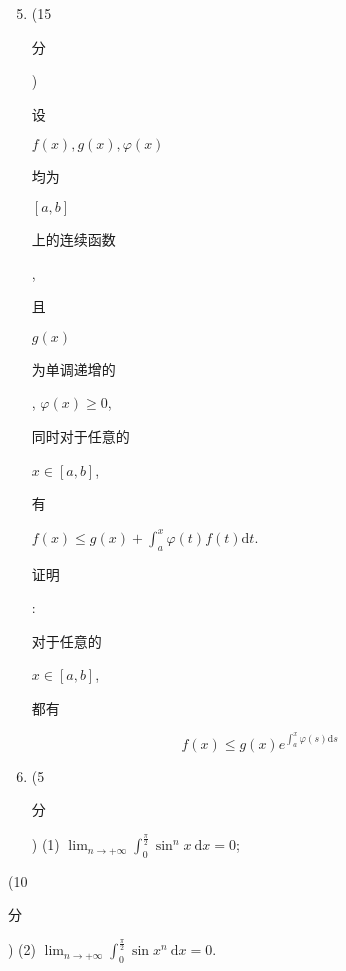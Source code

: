 \documentclass[10pt]{article}
\begin{document}
\begin{enumerate}
  \setcounter{enumi}{4}
  \item (15 \begin{CJK}{UTF8}{mj}分\end{CJK}) \begin{CJK}{UTF8}{mj}设\end{CJK} $f(x), g(x), \varphi(x)$ \begin{CJK}{UTF8}{mj}均为\end{CJK} $[a, b]$ \begin{CJK}{UTF8}{mj}上的连续函数\end{CJK}, \begin{CJK}{UTF8}{mj}且\end{CJK} $g(x)$ \begin{CJK}{UTF8}{mj}为单调递增的\end{CJK}, $\varphi(x) \geqslant 0$, \begin{CJK}{UTF8}{mj}同时对于任意的\end{CJK} $x \in[a, b]$, \begin{CJK}{UTF8}{mj}有\end{CJK} $f(x) \leqslant g(x)+\int_{a}^{x} \varphi(t) f(t) \mathrm{d} t$. \begin{CJK}{UTF8}{mj}证明\end{CJK}: \begin{CJK}{UTF8}{mj}对于任意的\end{CJK} $x \in[a, b]$, \begin{CJK}{UTF8}{mj}都有\end{CJK}
\end{enumerate}
$$
f(x) \leqslant g(x) e^{\int_{a}^{x} \varphi(s) \mathrm{d} s}
$$

\begin{enumerate}
  \setcounter{enumi}{5}
  \item (5 \begin{CJK}{UTF8}{mj}分\end{CJK}) (1) $\lim _{n \rightarrow+\infty} \int_{0}^{\frac{\pi}{2}} \sin ^{n} x \mathrm{~d} x=0$;
\end{enumerate}
(10 \begin{CJK}{UTF8}{mj}分\end{CJK}) (2) $\lim _{n \rightarrow+\infty} \int_{0}^{\frac{\pi}{2}} \sin x^{n} \mathrm{~d} x=0 .$
\end{document}
